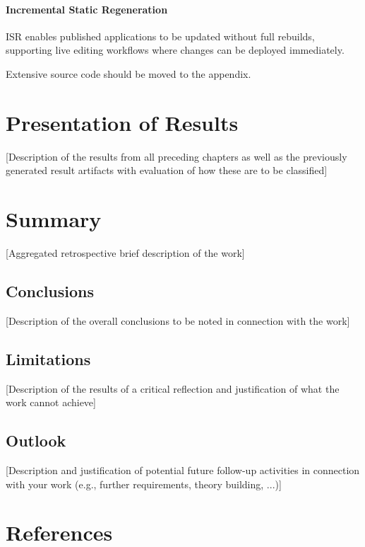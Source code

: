 \documentclass[oneside,12pt]{book}
\begin{document}
\subsubsection{Incremental Static Regeneration}

ISR enables published applications to be updated without full rebuilds, supporting live editing workflows where changes can be deployed immediately.


Extensive source code should be moved to the appendix.

\chapter{Presentation of Results}
[Description of the results from all preceding chapters as well as the previously generated result artifacts with evaluation of how these are to be classified]

\chapter{Summary}
[Aggregated retrospective brief description of the work]

\section{Conclusions}
[Description of the overall conclusions to be noted in connection with the work]

\section{Limitations}
[Description of the results of a critical reflection and justification of what the work cannot achieve]

\section{Outlook}
[Description and justification of potential future follow-up activities in connection with your work (e.g., further requirements, theory building, ...)]

\chapter*{References}
\printbibliography[heading=none,title={}]

\printglossaries
\end{document}
